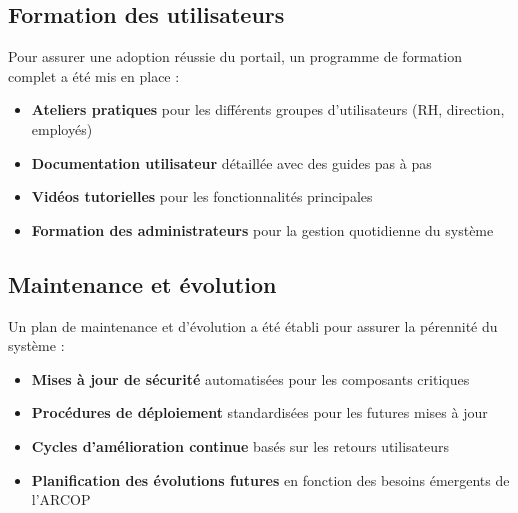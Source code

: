 \subsection{Formation des utilisateurs}
Pour assurer une adoption réussie du portail, un programme de formation complet a été mis en place :

\begin{itemize}
    \item \textbf{Ateliers pratiques} pour les différents groupes d'utilisateurs (RH, direction, employés)
    \item \textbf{Documentation utilisateur} détaillée avec des guides pas à pas
    \item \textbf{Vidéos tutorielles} pour les fonctionnalités principales
    \item \textbf{Formation des administrateurs} pour la gestion quotidienne du système
\end{itemize}

\subsection{Maintenance et évolution}
Un plan de maintenance et d'évolution a été établi pour assurer la pérennité du système :

\begin{itemize}
    \item \textbf{Mises à jour de sécurité} automatisées pour les composants critiques
    \item \textbf{Procédures de déploiement} standardisées pour les futures mises à jour
    \item \textbf{Cycles d'amélioration continue} basés sur les retours utilisateurs
    \item \textbf{Planification des évolutions futures} en fonction des besoins émergents de l'ARCOP
\end{itemize}
